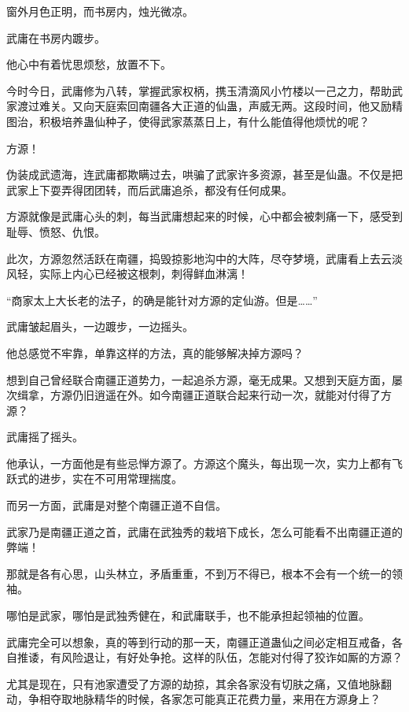 
\begin{this_body}

窗外月色正明，而书房内，烛光微凉。

武庸在书房内踱步。

他心中有着忧思烦愁，放置不下。

今时今日，武庸修为八转，掌握武家权柄，携玉清滴风小竹楼以一己之力，帮助武家渡过难关。又向天庭索回南疆各大正道的仙蛊，声威无两。这段时间，他又励精图治，积极培养蛊仙种子，使得武家蒸蒸日上，有什么能值得他烦忧的呢？

方源！

伪装成武遗海，连武庸都欺瞒过去，哄骗了武家许多资源，甚至是仙蛊。不仅是把武家上下耍弄得团团转，而后武庸追杀，都没有任何成果。

方源就像是武庸心头的刺，每当武庸想起来的时候，心中都会被刺痛一下，感受到耻辱、愤怒、仇恨。

此次，方源忽然活跃在南疆，捣毁掠影地沟中的大阵，尽夺梦境，武庸看上去云淡风轻，实际上内心已经被这根刺，刺得鲜血淋漓！

“商家太上大长老的法子，的确是能针对方源的定仙游。但是……”

武庸皱起眉头，一边踱步，一边摇头。

他总感觉不牢靠，单靠这样的方法，真的能够解决掉方源吗？

想到自己曾经联合南疆正道势力，一起追杀方源，毫无成果。又想到天庭方面，屡次缉拿，方源仍旧逍遥在外。如今南疆正道联合起来行动一次，就能对付得了方源？

武庸摇了摇头。

他承认，一方面他是有些忌惮方源了。方源这个魔头，每出现一次，实力上都有飞跃式的进步，实在不可用常理揣度。

而另一方面，武庸是对整个南疆正道不自信。

武家乃是南疆正道之首，武庸在武独秀的栽培下成长，怎么可能看不出南疆正道的弊端！

那就是各有心思，山头林立，矛盾重重，不到万不得已，根本不会有一个统一的领袖。

哪怕是武家，哪怕是武独秀健在，和武庸联手，也不能承担起领袖的位置。

武庸完全可以想象，真的等到行动的那一天，南疆正道蛊仙之间必定相互戒备，各自推诿，有风险退让，有好处争抢。这样的队伍，怎能对付得了狡诈如厮的方源？

尤其是现在，只有池家遭受了方源的劫掠，其余各家没有切肤之痛，又值地脉翻动，争相夺取地脉精华的时候，各家怎可能真正花费力量，来用在方源身上？


\end{this_body}
